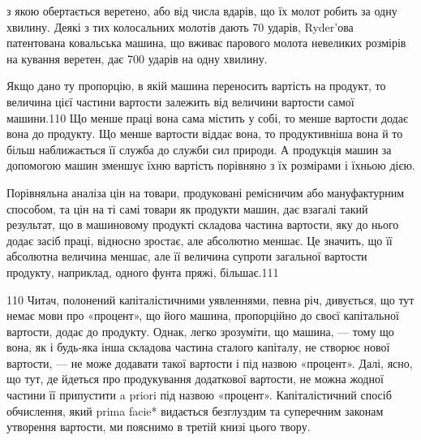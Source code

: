 з якою обертається веретено, або від числа вдарів, що їх молот
робить за одну хвилину. Деякі з тих колосальних молотів дають
70 ударів, Ryder’ова патентована ковальська машина, що вживає
парового молота невеликих розмірів на кування веретен, дає
700 ударів на одну хвилину.

Якщо дано ту пропорцію, в якій машина переносить вартість
на продукт, то величина цієї частини вартости залежить від величини
вартости самої машини.110 Що менше праці вона сама містить
у собі, то менше вартости додає вона до продукту. Що менше
вартости віддає вона, то продуктивніша вона й то більш наближається
її служба до служби сил природи. А продукція машин за
допомогою машин зменшує їхню вартість порівняно з їх розмірами
і їхньою дією.

Порівняльна аналіза цін на товари, продуковані ремісничим
або мануфактурним способом, та цін на ті самі товари як продукти
машин, дає взагалі такий результат, що в машиновому продукті
складова частина вартости, яку до нього додає засіб праці, відносно
зростає, але абсолютно меншає. Це значить, що її абсолютна
величина меншає, але її величина супроти загальної вартости
продукту, наприклад, одного фунта пряжі, більшає.111

110 Читач, полонений капіталістичними уявленнями, певна річ, дивується,
що тут немає мови про «процент», що його машина, пропорційно
до своєї капітальної вартости, додає до продукту. Однак, легко зрозуміти,
що машина, — тому що вона, як і будь-яка інша складова частина
сталого капіталу, не створює нової вартости, — не може додавати такої
вартости і під назвою «процент». Далі, ясно, що тут, де йдеться про продукування
додаткової вартости, не можна жодної частини її припустити
a priori під назвою «процент». Капіталістичний спосіб обчислення,
який prima facie* видається безглуздим та суперечним законам утворення
вартости, ми пояснимо в третій книзі цього твору.

